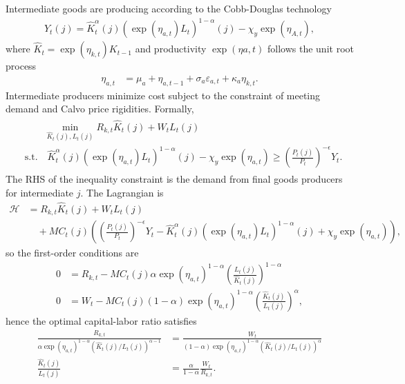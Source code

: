 \documentclass[12 pt, oneside]{article}
\theoremstyle{definition}
\theoremstyle{definition}
\theoremstyle{definition}
\newcommand{\calH}{\mathcal{H}}
\begin{document}
Intermediate goods are producing according to the Cobb-Douglas technology
\begin{align}\label{eq:intermediate goods production function}
  Y_t(j) =  \hat{K}_t^\alpha(j)(\exp(\eta_{a, t})L_t)^{1 - \alpha}(j) - \chi_y\exp(\eta_{A, t}),
\end{align}
where $\hat{K}_t = \exp(\eta_{k, t})K_{t - 1}$ and productivity $\exp(\eta{a, t})$ follows the unit root process
\begin{align}\label{eq:productivity process}
  \eta_{a, t} & = \mu_a + \eta_{a, t - 1} + \sigma_a \varepsilon_{a, t} + \kappa_a\eta_{k, t}.
\end{align}
Intermediate producers minimize cost subject to the constraint of meeting demand and Calvo price rigidities. Formally,
\begin{align}
  \begin{split}
    & \quad\quad\min_{\hat{K}_t(j), L_t(j)} R_{k, t} \hat{K}_t(j) + W_t L_t(j)\\
    &\text{s.t.}\quad  \hat{K}_t^\alpha(j) (\exp(\eta_{a, t})L_t)^{1 - \alpha}(j) - \chi_y\exp(\eta_{a, t}) \geq \left(\frac{P_t(j)}{P_t}\right)^{-\epsilon}Y_t.
  \end{split}
\end{align}
The RHS of the inequality constraint is the demand from final goods producers for intermediate $j$. The Lagrangian is
\begin{align*}
  \calH & = R_{k, t} \hat{K}_t(j) + W_t L_t(j)\\
        &\quad +  MC_t(j)\left(\left(\frac{P_t(j)}{P_t}\right)^{-\epsilon}Y_t - \hat{K}_t^\alpha(j) (\exp(\eta_{a, t})L_t)^{1 - \alpha}(j) + \chi_y\exp(\eta_{a, t})\right),
\end{align*}
so the first-order conditions are
\begin{align*}
  0 & = R_{k, t} - MC_t(j) \alpha \exp(\eta_{a, t})^{1 - \alpha} \left(\frac{L_t(j)}{\hat{K}_t(j)}\right)^{1 - \alpha}\\
  0 & = W_t - MC_t(j) (1-\alpha) \exp(\eta_{a, t})^{1 - \alpha}  \left(\frac{\hat{K}_t(j)}{L_t(j)}\right)^{\alpha},
\end{align*}
hence the optimal capital-labor ratio satisfies
\begin{align*}
  \frac{R_{k, t}}{\alpha \exp(\eta_{a, t})^{1 - \alpha}(\hat{K}_t(j)/L_t(j))^{\alpha - 1}} & = \frac{W_t}{(1-\alpha) \exp(\eta_{a, t})^{1 - \alpha}(\hat{K}_t(j)/L_t(j))^{ \alpha}}\\
  \frac{\hat{K}_t(j)}{L_t(j)} & =\frac{\alpha}{1 - \alpha} \frac{W_t}{R_{k, t}}.
\end{align*}
\end{document}

